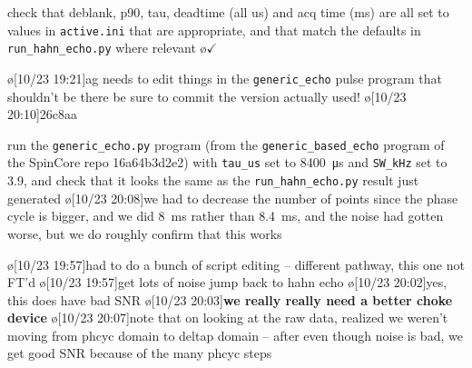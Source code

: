 check that deblank, p90, tau, deadtime (all us) and acq time (ms) are all set to values in \texttt{active.ini} that are appropriate, and that match the defaults in \texttt{run_hahn_echo.py} where relevant
\o{$\checkmark$}
\begin{err}
    \o[10/23 19:21]{ag needs to edit things in the \texttt{generic_echo} pulse program that shouldn't be there}
    be sure to commit the version actually used!
    \o[10/23 20:10]{26c8aa}
\end{err}
run the \texttt{generic_echo.py} program (from the \texttt{generic_based_echo} program of the SpinCore repo 16a64b3d2e2)
with
\texttt{tau_us} set to 8400~μs and \texttt{SW_kHz} set to 3.9,
and check that it looks the same as the \texttt{run_hahn_echo.py}
result just generated
\o[10/23 20:08]{we had to decrease the number of points since the phase cycle is bigger, and we did 8~ms rather than 8.4~ms, and the noise had gotten worse, but we do roughly confirm that this works}
\begin{err}
    \o[10/23 19:57]{had to do a bunch of script editing -- different pathway, this one not FT'd}
    \o[10/23 19:57]{get lots of noise}
    jump back to hahn echo
    \o[10/23 20:02]{yes, this does have bad SNR}
    \o[10/23 20:03]{\textbf{we really really need a better choke device}}
    \o[10/23 20:07]{note that on looking at the raw data, realized we weren't moving from phcyc domain to deltap domain -- after even though noise is bad, we get good SNR because of the many phcyc steps}
\end{err}
\par
